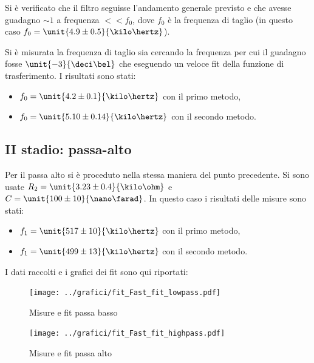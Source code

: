 \documentclass[10pt,a4paper]{article}
\begin{document}
Si è verificato che il filtro seguisse l'andamento generale previsto e che avesse guadagno $\sim 1$ a frequenza $<<f_0$, dove $f_0$ è la frequenza di taglio (in questo caso $f_0 = \unit{4.9 \pm 0.5}{\kilo\hertz}$).

Si è misurata la frequenza di taglio sia cercando la frequenza per cui il guadagno fosse $\unit{-3}{\deci\bel}$ che eseguendo un veloce fit della funzione di trasferimento.
I risultati sono stati:
\begin{itemize}
	\item $f_0 = \unit{4.2 \pm 0.1}{\kilo\hertz}$ con il primo metodo,
	\item $f_0 = \unit{5.10 \pm 0.14}{\kilo\hertz}$ con il secondo metodo.
\end{itemize}

\subsection{II stadio: passa-alto}
Per il passa alto si è proceduto nella stessa maniera del punto precedente. Si sono usate $R_2=\unit{3.23 \pm 0.4}{\kilo\ohm}$ e $C=\unit{100 \pm 10}{\nano\farad}$.
In questo caso i risultati delle misure sono stati:
\begin{itemize}
	\item $f_1 = \unit{517 \pm 10}{\kilo\hertz}$ con il primo metodo,
	\item $f_1 = \unit{499 \pm 13}{\kilo\hertz}$ con il secondo metodo.
\end{itemize}

I dati raccolti e i grafici dei fit sono qui riportati:

\begin{figure}[h!]
	\centering
	\begin{minipage}[c]{0.49\textwidth}
		\resizebox{\textwidth}{!}{
			}
	\end{minipage}
\begin{minipage}[c]{0.49\textwidth}
	\resizebox{\textwidth}{!}{
		}
\end{minipage}
\end{figure}

\begin{figure}[h!]
	\centering
	\begin{minipage}[c]{0.5\textwidth}
		\centering
		\texttt{[image: ../grafici/fit\_Fast\_fit\_lowpass.pdf]}
		\caption{Misure e fit passa basso}
	\end{minipage}%
	\begin{minipage}[c]{0.5\textwidth}
		\centering
		\texttt{[image: ../grafici/fit\_Fast\_fit\_highpass.pdf]}
		\caption{Misure e fit passa alto}
	\end{minipage}
\end{figure}
\end{document}
